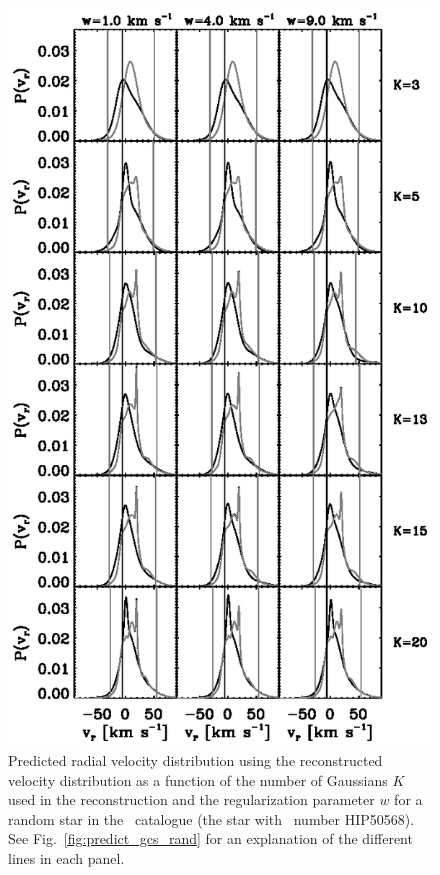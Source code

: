\clearpage
\begin{figure}
\includegraphics{figs_veldist/tile_onepred.ps}
\caption[Predicted radial velocity distribution using the reconstructed velocity distribution as a function of the number of Gaussians $K$ used in the reconstruction and the regularization parameter $w$ for a random star in the \gcsabb\ catalogue (the star with \Hipparcos\ number HIP50568)]{Predicted radial velocity distribution using the reconstructed velocity distribution as a function of the number of Gaussians $K$ used in the reconstruction and the regularization parameter $w$ for a random star in the \gcsabb\ catalogue (the star with \Hipparcos\ number HIP50568). See Fig.~\ref{fig:predict_gcs_rand} for an explanation of the different lines in each panel.}%
\label{fig:tile_onepred}
\end{figure}


